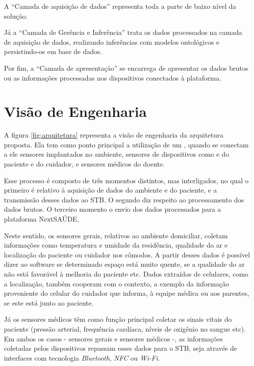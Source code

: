 A ``Camada de aquisição de dados'' representa toda a parte de baixo nível da
solução.

Já a ``Camada de Gerência e Inferência'' trata os dados processados na camada
de aquisição de dados, realizando inferências com modelos ontológicos e 
persistindo-os em base de dados.

Por fim, a ``Camada de apresentação'' se encarrega de apresentar os dados brutos
ou as informações processadas nos dispositivos conectados à plataforma.



\section{Visão de Engenharia} \label{sec:visao-engenharia}

A figura \ref{fig:arquitetura} representa a visão de engenharia da arquitetura
proposta. Ela tem como ponto principal a utilização de um \stb[], quando se
conectam a ele sensores  implantados no ambiente, sensores de dispositivos como
\smartphones[] e  \smartwatches[] do paciente e do cuidador, e sensores médicos
do doente.


Esse processo é composto de três momentos distintos, mas  interligados, no qual
o primeiro é relativo à aquisição de dados do ambiente e do paciente, e a
transmissão desses dados ao STB. O segundo diz respeito ao processamento dos
dados brutos. O terceiro momento o envio dos dados processados para a plataforma
NextSAÚDE.

Neste sentido, os sensores gerais, relativos ao ambiente domiciliar, coletam
informações como  temperatura e umidade da residência, qualidade do ar e
localização do paciente ou cuidador nos cômodos. A partir desses dados é
possível dizer ao software se determinado espaço está muito quente, se a
qualidade do ar não está favorável à melhoria do paciente etc. Dados extraídos
de celulares, como a localização, também cooperam com o contexto, a exemplo da
informação proveniente do celular do cuidador que informa, à equipe médica ou
aos parentes, se este está junto ao paciente.

Já os sensores médicos têm como função principal coletar os sinais vitais do
paciente (pressão arterial, frequência cardíaca, níveis de oxigênio no sangue
etc). Em ambos os casos - sensores gerais e sensores médicos -, as informações
coletadas pelos dispositivos repassam  esses dados para o STB, seja através de
interfaces com tecnologia  \textit{Bluetooth}, \textit{NFC} ou \textit{Wi-Fi}.

